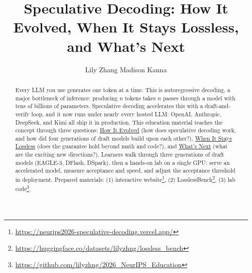 \documentclass{article}
\title{Speculative Decoding: How It Evolved, When It Stays Lossless, and What's Next}
\author{%
  Lily Zhang \And Madison Kanna
}
\begin{document}
\maketitle

\begin{abstract}
Every LLM you use generates one token at a time. This is autoregressive decoding, a major bottleneck of inference: producing $n$ tokens takes $n$ passes through a model with tens of billions of parameters. Speculative decoding accelerates this with a draft-and-verify loop, and it now runs under nearly every hosted LLM: OpenAI, Anthropic, DeepSeek, and Kimi all ship it in production. This education material teaches the concept through three questions: \underline{How It Evolved} (how does speculative decoding work, and how did four generations of draft models build upon each other?), \underline{When It Stays Lossless} (does the guarantee hold beyond math and code?), and \underline{What's Next} (what are the exciting new directions?). Learners walk through three generations of draft models (EAGLE-3, DFlash, DSpark), then a hands-on lab on a single GPU: serve an accelerated model, measure acceptance and speed, and adjust the acceptance threshold in deployment. Prepared materials: (1) interactive website\footnote{\scriptsize\url{https://neurips2026-speculative-decoding.vercel.app/}}, (2) LosslessBench\footnote{\scriptsize\url{https://huggingface.co/datasets/lilyzhng/lossless_bench}}, (3) lab code\footnote{\scriptsize\url{https://github.com/lilyzhng/2026_NeurIPS_Education}}.
\end{abstract}
\end{document}
